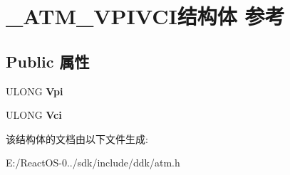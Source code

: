 \hypertarget{struct___a_t_m___v_p_i_v_c_i}{}\section{\+\_\+\+A\+T\+M\+\_\+\+V\+P\+I\+V\+C\+I结构体 参考}
\label{struct___a_t_m___v_p_i_v_c_i}
\subsection*{Public 属性}
\begin{DoxyCompactItemize}
\item 
\mbox{\label{struct___a_t_m___v_p_i_v_c_i_a4d50f07304e638a87bff9fead7b8be00}} 
U\+L\+O\+NG {\bfseries Vpi}
\item 
\mbox{\label{struct___a_t_m___v_p_i_v_c_i_affbea12bc794de7d3776d434834c39e4}} 
U\+L\+O\+NG {\bfseries Vci}
\end{DoxyCompactItemize}


该结构体的文档由以下文件生成\+:\begin{DoxyCompactItemize}
\item 
E\+:/\+React\+O\+S-\/0../sdk/include/ddk/atm.\+h\end{DoxyCompactItemize}
